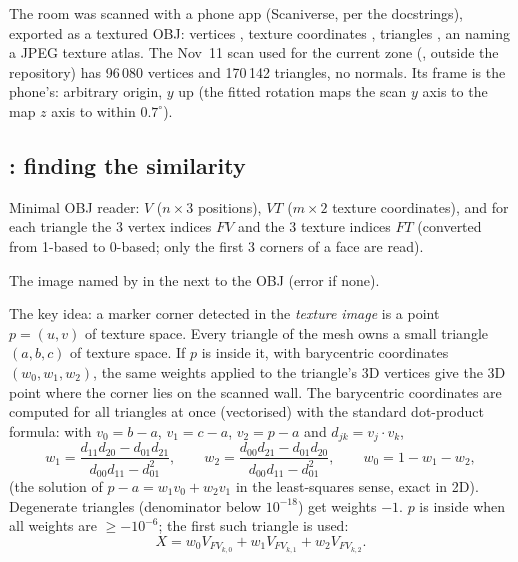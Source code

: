 The room was scanned with a phone app (Scaniverse, per the docstrings), exported as a textured OBJ: vertices
, texture coordinates , triangles , an  naming a JPEG texture atlas.
The Nov~11 scan used for the current zone (, outside the repository) has 96\,080
vertices and 170\,142 triangles, no normals. Its frame is the phone's: arbitrary origin, $y$ up (the fitted
rotation maps the scan $y$ axis to the map $z$ axis to within $0.7^\circ$).

\subsection{\texorpdfstring{}{align\_scan.py}: finding the similarity}

Minimal OBJ reader: $V$ ($n\times3$ positions), $VT$ ($m \times 2$ texture coordinates), and for each triangle the
3 vertex indices $FV$ and the 3 texture indices $FT$ (converted from 1-based to 0-based; only the first 3 corners
of a face are read).

The image named by  in the  next to the OBJ (error if none).

The key idea: a marker corner detected in the \emph{texture image} is a point $p = (u, v)$ of texture space.
Every triangle of the mesh owns a small triangle $(a, b, c)$ of texture space. If $p$ is inside it, with
barycentric coordinates $(w_0, w_1, w_2)$, the same weights applied to the triangle's 3D vertices give the 3D
point where the corner lies on the scanned wall. The barycentric coordinates are computed for all triangles at
once (vectorised) with the standard dot-product formula: with $v_0 = b - a$, $v_1 = c - a$, $v_2 = p - a$ and
$d_{jk} = v_j \cdot v_k$,
\[
w_1 = \frac{d_{11} d_{20} - d_{01} d_{21}}{d_{00} d_{11} - d_{01}^2},\qquad
w_2 = \frac{d_{00} d_{21} - d_{01} d_{20}}{d_{00} d_{11} - d_{01}^2},\qquad
w_0 = 1 - w_1 - w_2,
\]
(the solution of $p - a = w_1 v_0 + w_2 v_1$ in the least-squares sense, exact in 2D). Degenerate triangles
(denominator below $10^{-18}$) get weights $-1$. $p$ is inside when all weights are $\geq -10^{-6}$; the
first such triangle is used:
\[
X = w_0 V_{FV_{k,0}} + w_1 V_{FV_{k,1}} + w_2 V_{FV_{k,2}} .
\]

